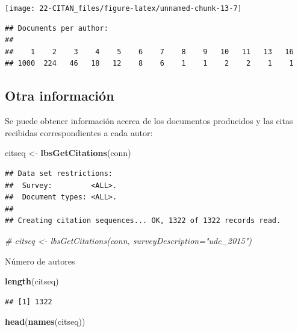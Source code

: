 \documentclass[]{book}
\newenvironment{Shaded}{\begin{snugshade}}{\end{snugshade}}
\newcommand{\CommentTok}[1]{\textcolor[rgb]{0.56,0.35,0.01}{\textit{#1}}}
\newcommand{\KeywordTok}[1]{\textcolor[rgb]{0.13,0.29,0.53}{\textbf{#1}}}
\newcommand{\NormalTok}[1]{#1}
\newcommand{\StringTok}[1]{\textcolor[rgb]{0.31,0.60,0.02}{#1}}
\begin{document}
\begin{center}\texttt{[image: 22-CITAN\_files/figure-latex/unnamed-chunk-13-7]} \end{center}

\begin{verbatim}
## Documents per author:
## 
##    1    2    3    4    5    6    7    8    9   10   11   13   16 
## 1000  224   46   18   12    8    6    1    1    2    2    1    1
\end{verbatim}

\hypertarget{otra-informacion}{%
\subsection{Otra información}\label{otra-informacion}}

Se puede obtener información acerca de los documentos producidos y las citas
recibidas correspondientes a cada autor:

\begin{Shaded}
\begin{Highlighting}[]
\NormalTok{citseq <-}\StringTok{ }\KeywordTok{lbsGetCitations}\NormalTok{(conn)}
\end{Highlighting}
\end{Shaded}

\begin{verbatim}
## Data set restrictions:
##  Survey:         <ALL>.
##  Document types: <ALL>.
## 
## Creating citation sequences... OK, 1322 of 1322 records read.
\end{verbatim}

\begin{Shaded}
\begin{Highlighting}[]
\CommentTok{# citseq <- lbsGetCitations(conn, surveyDescription="udc_2015")}
\end{Highlighting}
\end{Shaded}

Número de autores

\begin{Shaded}
\begin{Highlighting}[]
\KeywordTok{length}\NormalTok{(citseq) }
\end{Highlighting}
\end{Shaded}

\begin{verbatim}
## [1] 1322
\end{verbatim}

\begin{Shaded}
\begin{Highlighting}[]
\KeywordTok{head}\NormalTok{(}\KeywordTok{names}\NormalTok{(citseq))}
\end{Highlighting}
\end{Shaded}
\end{document}
